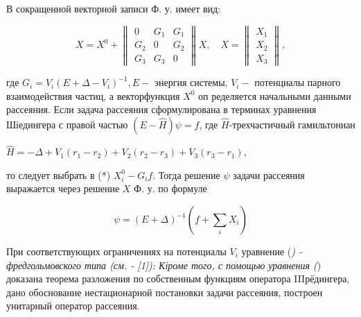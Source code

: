 \documentclass[10pt]{article}
\begin{document}
В сокращенной векторной записи Ф. у. имеет вид:



\[

X=X^{0}+\left\|\begin{array}{lll}

0 & G_{1} & G_{1} \\

G_{2} & 0 & G_{2} \\

G_{3} & G_{3} & 0

\end{array}\right\| X, \quad X=\left\|\begin{array}{l}

X_{1} \\

X_{2} \\

X_{3}

\end{array}\right\|,

\]



где $G_{i}=V_{i}\left(E+\Delta-V_{i}\right)^{-1}, E-$ энергия системы, $V_{i}-$ потенциалы парного взаимодействия частиц, а векторфункция $X^{0}$ оп ределяется начальными данными рассеяния. Если задача рассеяния сформулирована в терминах уравнения Шіедингера с правой частью $(E-\hat{H}) \psi=f$, где $\hat{H}$-трехчастичный гамильтониан



$\widehat{H}=-\Delta+V_{1}\left(r_{1}-r_{2}\right)+V_{2}\left(r_{2}-r_{3}\right)+V_{3}\left(r_{3}-r_{1}\right)$,



то следует выбрать в (*) $X_{i}^{0}-G_{i} f$. Тогда решение $\psi$ задачи рассеяния выражается через решение $X$ Ф. у. по формуле



\[

\psi=(E+\Delta)^{-1}\left(f+\sum_{i} X_{i}\right)

\]



При соответствующих ограничениях на потенциалы $V_{i}$ уравнение (\textit{) - фредгольмовского типа (см. - [1]): Кіроме того, с помощью уравнения (}) доказана теорема разложения по собственным функциям оператора IIIрёдингера, дано обоснование нестационарной постановки задачи рассеяния, построен унитарный оператор рассеяния.
\end{document}
